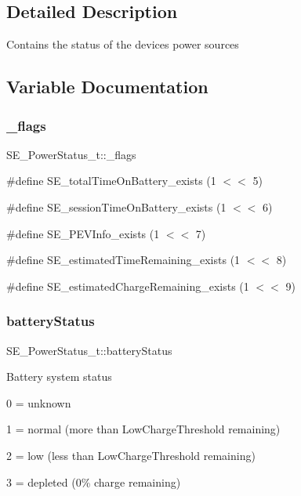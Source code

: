 \subsection{Detailed Description}
Contains the status of the device\textquotesingle{}s power sources 

\subsection{Variable Documentation}
\mbox{\label{group__PowerStatus_ga89efe1b7a819073171911ffd6befa30a}} 
\subsubsection{\texorpdfstring{\+\_\+flags}{\_flags}}
{\footnotesize\ttfamily S\+E\+\_\+\+Power\+Status\+\_\+t\+::\+\_\+flags}

\#define S\+E\+\_\+total\+Time\+On\+Battery\+\_\+exists (1 $<$$<$ 5)

\#define S\+E\+\_\+session\+Time\+On\+Battery\+\_\+exists (1 $<$$<$ 6)

\#define S\+E\+\_\+\+P\+E\+V\+Info\+\_\+exists (1 $<$$<$ 7)

\#define S\+E\+\_\+estimated\+Time\+Remaining\+\_\+exists (1 $<$$<$ 8)

\#define S\+E\+\_\+estimated\+Charge\+Remaining\+\_\+exists (1 $<$$<$ 9) \mbox{\label{group__PowerStatus_ga76bdf536a5aa3eea3495b9a8ca737494}} 
\subsubsection{\texorpdfstring{battery\+Status}{batteryStatus}}
{\footnotesize\ttfamily S\+E\+\_\+\+Power\+Status\+\_\+t\+::battery\+Status}

Battery system status

0 = unknown

1 = normal (more than Low\+Charge\+Threshold remaining)

2 = low (less than Low\+Charge\+Threshold remaining)

3 = depleted (0\% charge remaining)

